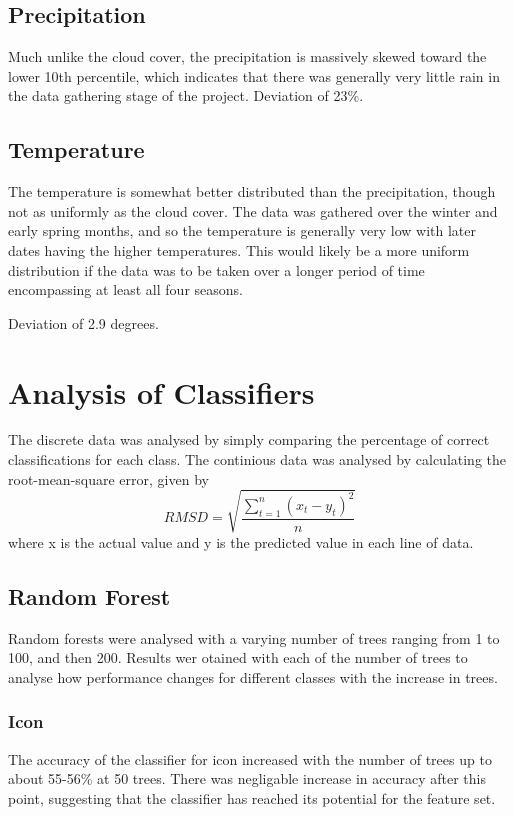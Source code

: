 \documentclass[a4paper,12pt,twoside]{report}
\begin{document}
\subsection{Precipitation}
Much unlike the cloud cover, the precipitation is massively skewed toward the lower 10th percentile, which indicates that there was generally very little rain in the data gathering stage of the project.
Deviation of 23\%.

\subsection{Temperature}
The temperature is somewhat better distributed than the precipitation, though not as uniformly as the cloud cover. The data was gathered over the winter and early spring months, and so the temperature is generally very low with later dates having the higher temperatures. This would likely be a more uniform distribution if the data was to be taken over a longer period of time encompassing at least all four seasons.

Deviation of 2.9 degrees.

\section{Analysis of Classifiers}
The discrete data was analysed by simply comparing the percentage of correct classifications for each class.
The continious data was analysed by calculating the root-mean-square error, given by
$$RMSD = \sqrt{\frac{\sum_{t=1}^n (x_t - y_t)^2}{n}}$$
where x is the actual value and y is the predicted value in each line of data.

\subsection{Random Forest}
Random forests were analysed with a varying number of trees ranging from 1 to 100, and then 200. Results wer otained with each of the number of trees to analyse how performance changes for different classes with the increase in trees.

\subsubsection{Icon}
The accuracy of the classifier for icon increased with the number of trees up to about 55-56\% at 50 trees. There was negligable increase in accuracy after this point, suggesting that the classifier has reached its potential for the feature set.
\end{document}
